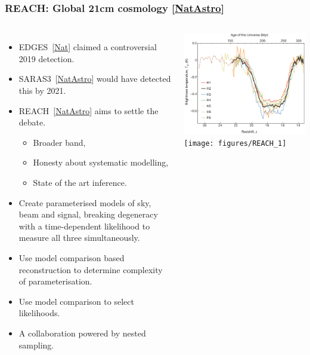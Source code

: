\documentclass[aspectratio=169]{beamer}
\begin{document}
\begin{frame}
    \frametitle{REACH: Global 21cm cosmology [\href{https://www.nature.com/articles/s41550-022-01709-9}{NatAstro}]}
    \begin{columns}
        \begin{itemize}
            \item EDGES~[\href{https://www.nature.com/articles/nature25792}{Nat}] claimed a controversial 2019 detection.
            \item SARAS3~[\href{https://www.nature.com/articles/s41550-022-01610-5}{NatAstro}]  would have detected this by 2021.
            \item REACH~[\href{https://www.nature.com/articles/s41550-022-01709-9}{NatAstro}] aims to settle the debate.
                \begin{itemize}
                    \item Broader band,
                    \item Honesty about systematic modelling,
                    \item State of the art inference.
                \end{itemize}
            \item Create parameterised models of sky, beam and signal, breaking degeneracy with a time-dependent likelihood to measure all three simultaneously.
            \item Use model comparison based reconstruction to determine complexity of parameterisation.
            \item Use model comparison to select likelihoods.
            \item A collaboration powered by nested sampling.
        \end{itemize}

        \includegraphics[width=\textwidth]{figures/EDGES}
        \texttt{[image: figures/REACH\_1]}

    \end{columns}

\end{frame}
\end{document}

